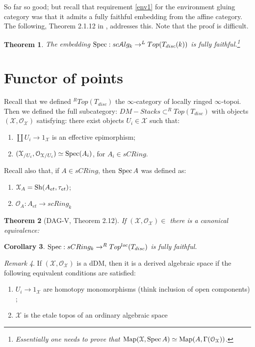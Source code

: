 \documentclass[10pt,a4paper,reqno,oneside]{book} %
\theoremstyle{plain}
\newtheorem{thm}{Theorem}[section]
\newtheorem{cor}[thm]{Corollary}
\theoremstyle{definition}
\theoremstyle{remark}
\newtheorem{rem}[thm]{Remark}
\numberwithin{equation}{section}
\begin{document}
So far so good; but recall that requirement \ref{env1} for the environment gluing category was that it admits a fully
faithful embedding from the affine category. The following, Theorem 2.1.12 in \cite{DAG-V}, addresses this. Note that
the proof is difficult.

\begin{thm}
The embedding $\operatorname{Spec} : sc\mathcal A lg_k \to ^L Top(T_{disc}(k))$ is fully faithful.\footnote{Essentially one needs to prove that
$\operatorname{Map}(\mathcal{X}, \operatorname{Spec} A) \simeq \operatorname{Map}(A, \Gamma(\mathcal{O}_{\mathcal{X}}))$.}
\end{thm}



\section{Functor of points}
Recall that we defined $^R Top(T_{disc})$ the $\infty$-category of locally ringed $\infty$-topoi. Then we defined the
full subcategory: $DM-Stacks \subset ^R Top(T_{disc})$ with objects $(\mathcal{X},\mathcal{O}_{\mathcal{X}})$ satisfying:
there exist objects $U_i \in \mathcal{X}$ such that:
\begin{enumerate}
\item $\coprod U_i \to 1_{\mathcal{X}}$ is an effective epimorphism;
\item $(\mathcal{X}_{/U_i}, \mathcal{O}_{\mathcal{X}/U_i}) \simeq \operatorname{Spec} (A_i)$, for $A_i \in sCRing$.
\end{enumerate}

Recall also that, if $A \in sCRing$, then $\operatorname{Spec} A$ was defined as:
\begin{enumerate}
\item $\mathcal{X}_A = \mathrm{Sh} (A_{et}, \tau_{et})$;
\item $\mathcal{O}_A : A_{et} \to scRing_k$
\end{enumerate}

\begin{thm}[DAG-V, Theorem 2.12]
If $(\mathcal{X},\mathcal{O}_{\mathcal{X}}) \in $ there is a canonical equivalence: 
\end{thm}

\begin{cor}
$\operatorname{Spec} : sCRing_k \to ^R Top^{loc}(T_{disc})$ is fully faithful.
\end{cor}

\begin{rem}
If $(\mathcal{X},\mathcal{O}_{\mathcal{X}})$ is a dDM, then it is a derived algebraic space if the following equivalent
conditions are satisfied:
\begin{enumerate}
\item $U_i \to 1_{\mathcal{X}}$ are homotopy monomorphisms (think inclusion of open components) ;
\item $\mathcal{X}$ is the etale topos of an ordinary algebraic space
\end{enumerate}
\end{rem}
\end{document}
